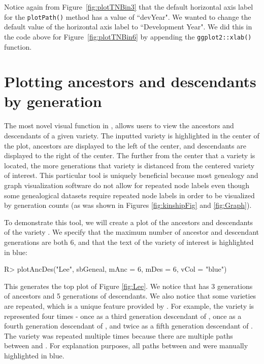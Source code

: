 \documentclass[article,shortnames]{jss}
\begin{document}
Notice again from Figure~\ref{fig:plotTNBin3} that the default horizontal axis label for the \texttt{plotPath()} method has a value of ``devYear". We wanted to change the default value of the horizontal axis label to ``Development Year". We did this in the code above for Figure~\ref{fig:plotTNBin6} by appending the \texttt{ggplot2::xlab()} function.

\section{Plotting ancestors and descendants by generation}
\label{remedy}

The most novel visual function in ,  allows users to view the ancestors and descendants of a given variety. The inputted variety is highlighted in the center of the plot, ancestors are displayed to the left of the center, and descendants are displayed to the right of the center. The further from the center that a variety is located, the more generations that variety is distanced from the centered variety of interest. This particular  tool is uniquely beneficial because most genealogy and graph visualization software do not allow for repeated node labels even though some genealogical datasets require repeated node labels in order to be visualized by generation counts (as was shown in Figures \ref{fig:kinshipFig} and \ref{fig:Graph}).

To demonstrate this tool, we will create a plot of the ancestors and descendants of the variety . We specify that the maximum number of ancestor and descendant generations are both 6, and that the text of the variety of interest is highlighted in blue:

\begin{Code}
R> plotAncDes("Lee", sbGeneal, mAnc = 6, mDes = 6, vCol = "blue")
\end{Code}

This generates the top plot of Figure \ref{fig:Lee}. We notice that  has 3 generations of ancestors and 5 generations of descendants. We also notice that some varieties are repeated, which is a unique feature provided by . For example, the variety  is represented four times - once as a third generation descendant of , once as a fourth generation descendant of , and twice as a fifth generation descendant of . The variety  was repeated multiple times because there are multiple paths between  and . For explanation purposes, all paths between  and  were manually highlighted in blue.
\end{document}
